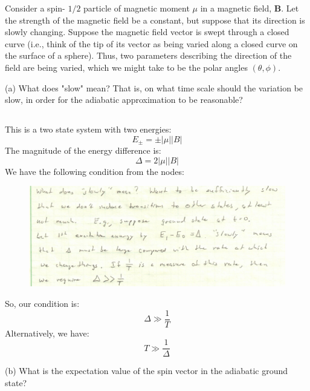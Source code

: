 \documentclass[12pt]{article}
\begin{document}
Consider a spin- $1 / 2$ particle of magnetic moment $\mu$ in a magnetic field, $\mathbf{B}$. Let the strength of the magnetic field be a constant, but suppose that its direction is slowly changing. Suppose the magnetic field vector is swept through a closed curve (i.e., think of the tip of its vector as being varied along a closed curve on the surface of a sphere). Thus, two parameters describing the direction of the field are being varied, which we might take to be the polar angles $(\theta, \phi)$.

(a) What does "slow" mean? That is, on what time scale should the variation be slow, in order for the adiabatic approximation to be reasonable?
\subsection{}
This is a two state system with two energies:
\begin{equation}
  E_{\pm}=\pm |\mu| |B|
\end{equation}
The magnitude of the energy difference is:
\begin{equation}
  \Delta = 2|\mu| |B|
\end{equation}
We have the following condition from the nodes:
\begin{figure}
  \centering
  \includegraphics[scale=0.5]{adiabatic.png}
\end{figure}
So, our condition is:
\begin{equation}
  \Delta  \gg \frac{1}{T}
\end{equation}
Alternatively, we have:
\begin{equation}
  T \gg \frac{1}{\Delta}
\end{equation}

(b) What is the expectation value of the spin vector in the adiabatic ground state?
\end{document}
